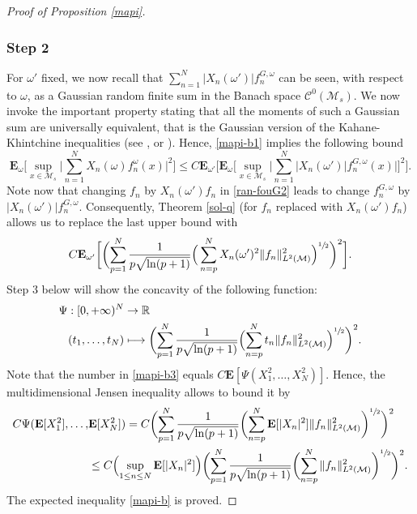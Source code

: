 \documentclass[10pt]{amsart}
\def\mto{\mathchoice{\longmapsto}{\mapsto}{\mapsto}{\mapsto}}
\theoremstyle{theorem}
\theoremstyle{definition}
\newcommand\R{\mathbb{R}}
\newcommand\E{\mathbf{E}}
\newcommand\CC{\mathcal{C}}
\begin{document}
\begin{proof}[Proof of Proposition \ref{mapi}]
\subsubsection*{Step 2}
For $\omega'$ fixed, we now recall that $\sum_{n=1}^N |X_n(\omega')| f_n^{G,\omega}$ can be seen, with respect to $\omega$, as a Gaussian random finite sum in the Banach space $\CC^0(\mathcal{M}_s)$.
We now invoke the important property stating that all the moments of such a Gaussian sum are universally equivalent, that is the Gaussian version of the Kahane-Khintchine inequalities (see \cite[Cor.\,3.2]{ledoux}, \cite[p.\,44]{pisier1981} or \cite[p.\,256, Cor.\,V.27]{queff1}).
Hence, \eqref{mapi-b1} implies the following bound
\begin{equation*}
\E_{\omega}\biggl[\sup_{x\in \mathcal{M}_s}\Big|\sum_{n=1}^N X_n(\omega)f_n^{\omega}(x)\Big|^{2} \biggr]\leq C\E_{\omega'}\biggl[\E_{\omega}\biggl[\sup_{x\in \mathcal{M}_s}\Big| \sum_{n=1}^N |X_n(\omega')| f_n^{G,\omega}(x) \Big| \biggr]^2 \biggr].
\end{equation*}
Note now that changing $f_n$ by $X_n(\omega')f_n$ in \eqref{ran-fouG2} leads to change $f_n^{G,\omega}$ by $|X_n(\omega')| f_n^{G,\omega}$.
Consequently, Theorem \ref{sol-q} (for $f_n$ replaced with $X_n(\omega')f_n$) allows us to replace the last upper bound with
\begin{equation}\label{mapi-b3}
C\E_{\omega'}\biggl[\biggl(\sum_{p=1}^N \frac{1}{p\sqrt{\ln(p+1)}}\Big(\sum_{n=p}^{N} X_n(\omega')^2\|f_n\|_{L^2(\mathcal{M})}^2 \Big)^{\sfrac{1}{2}}\biggr)^2\biggr].
\end{equation}
Step 3 below will show the concavity of the following function:
\begin{equation}\label{concav}
\begin{split}
\Psi: [0,+\infty)^N & \to\R \\
(t_1,\dots,t_N) & \mto \biggl(\sum_{p=1}^N \frac{1}{p\sqrt{\ln(p+1)}}\Bigl(\sum_{n=p}^{N} t_n \|f_n\|_{L^2(\mathcal{M})}^2 \Bigr)^{\sfrac{1}{2}}\biggr)^2.
\end{split}
\end{equation}
Note that the number in \eqref{mapi-b3} equals $C \E[\Psi(X_1^2,\dots,X_N^2)]$.
Hence, the multidimensional Jensen inequality allows to bound it by
\begin{align*}
C \Psi(\E[X_1^2],\dots,&\E[X_N^2])
=C\biggl(\sum_{p=1}^N \frac{1}{p\sqrt{\ln(p+1)}}\biggl(\sum_{n=p}^{N} \E[| X_n|^2]\|f_n\|_{L^2(\mathcal{M})}^2 \biggr)^{\sfrac{1}{2}}\biggr)^2\\
&\leq C \Bigl(\sup_{1\leq n\leq N} \E[|X_n|^2] \Bigr)
\biggl(\sum_{p=1}^N \frac{1}{p\sqrt{\ln(p+1)}}\biggl(\sum_{n=p}^{N} \|f_n\|_{L^2(\mathcal{M})}^2 \biggr)^{\sfrac{1}{2}}\biggr)^2.
\end{align*}
The expected inequality \eqref{mapi-b} is proved.


\end{proof}
\end{document}
